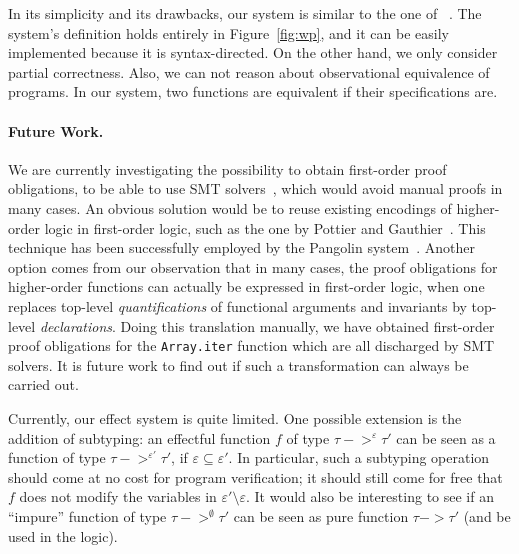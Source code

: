 \documentclass[a4paper]{llncs}
\begin{document}
In its simplicity and its drawbacks, our system is similar to the one
of ~\cite{regis-gianas-pottier-08}. The system's definition holds
entirely in Figure~\ref{fig:wp}, and it can be easily
implemented because it is syntax-directed. On the other hand, we only
consider partial correctness. Also, we can not reason about
observational equivalence of programs. In our system, two functions
are equivalent if their specifications are.


\paragraph{Future Work.}

We are currently investigating the possibility to obtain first-order proof
obligations, to be able to use SMT solvers~\cite{RanTin-SMTLIB}, which would
avoid manual proofs in many cases. An obvious solution would be to reuse
existing encodings of higher-order logic in first-order logic, such as the one
by Pottier and Gauthier~\cite{pottier-gauthier-hosc}. This technique has been
successfully employed by the Pangolin system~\cite{regis-gianas-pottier-08}.
Another option comes from our observation that in many cases, the proof
obligations for higher-order functions can actually be expressed in
first-order logic, when one replaces top-level {\em quantifications} of
functional arguments and invariants by top-level {\em declarations}. Doing
this translation manually, we have obtained first-order proof
obligations for the {\tt Array.iter} function which are all discharged by
SMT solvers. It is future work to find out if such a transformation can always
be carried out.

Currently, our effect system is quite limited. One possible extension is the
addition of subtyping: an effectful function $f$ of type $τ ->^ετ'$ can be seen
as a function of type $τ ->^{ε'}τ'$, if $ε\subseteq ε'$. In particular, such a
subtyping operation should come at no cost for program verification; it should
still come for free that $f$ does not modify the variables in $ε'\setminus ε$. It
would also be interesting to see if an ``impure'' function of type $τ
->^\emptyset τ'$ can be seen as pure function $τ -> τ'$ (and be used in the
logic).
\end{document}
